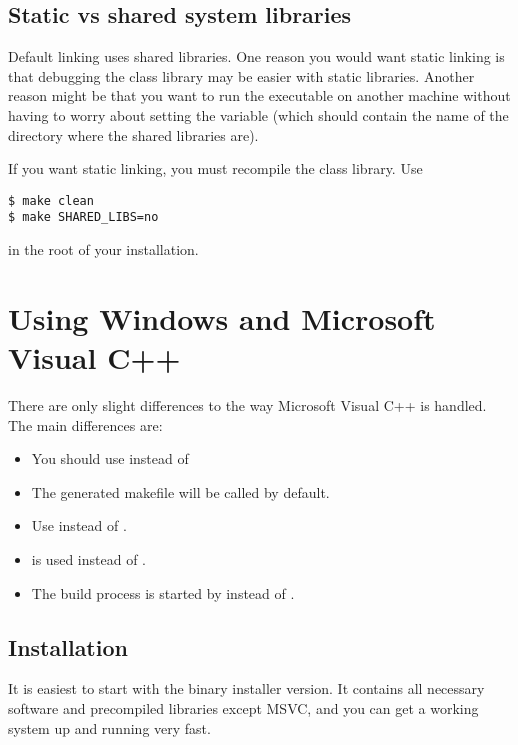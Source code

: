 \subsection{Static vs shared {\opp} system libraries}

Default linking uses shared libraries. One
reason you would want static linking is that debugging
the {\opp} class library may be easier with static libraries.
Another reason might be that you want to run the executable on
another machine without having to worry about setting the
 variable (which should contain the name
of the directory where the {\opp} shared libraries are).

If you want static linking, you must
recompile the {\opp} class library. Use

\begin{verbatim}
$ make clean
$ make SHARED_LIBS=no
\end{verbatim}

in the root of your {\opp} installation.

\section{Using Windows and Microsoft Visual C++}

There are only slight differences to the way Microsoft Visual C++
is handled. The main differences are:
\begin{itemize}
  \item{You should use  instead of }
  \item{The generated makefile will be called  by default.}
  \item{Use  instead of .}
  \item{ is used instead of .}
  \item{The build process is started by  instead of .}
\end{itemize}

\subsection{Installation}

It is easiest to start with the binary installer version.
It contains all necessary software and precompiled
libraries except MSVC, and you can get a
working system up and running very fast.

